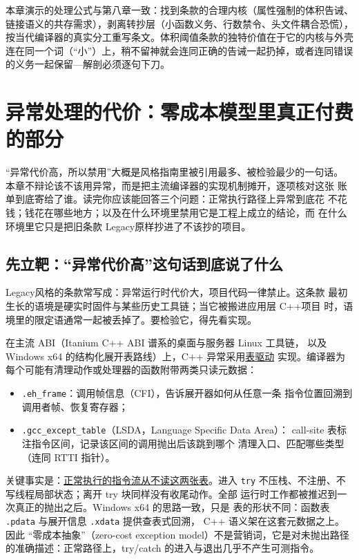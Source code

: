 \documentclass[12pt,a4paper,fontset=fandol]{ctexbook}
\newcommand{\Tp}[1]{\texttt{#1}}
\newcommand{\Lang}[1]{\textsf{#1}}
\newcommand{\CPP}{\Lang{C++}}
\newcommand{\DomTra}{\Lang{Legacy}}
\begin{document}
\begin{note}[title={与第八章的收束衔接}]
本章演示的处理公式与第八章一致：找到条款的合理内核（属性强制的体积告诫、链接语义的共存需求），剥离转抄层（小函数义务、行数禁令、头文件耦合恐慌），按当代编译器的真实分工重写条文。体积阈值条款的独特价值在于它的内核与外壳连在同一个词（``小''）上，稍不留神就会连同正确的告诫一起扔掉，或者连同错误的义务一起保留---解剖必须逐句下刀。
\end{note}


\chapter{异常处理的代价：零成本模型里真正付费的部分}
\label{ch:ch10-ehcost}

``异常代价高，所以禁用''大概是风格指南里被引用最多、被检验最少的一句话。
本章不辩论该不该用异常，而是把主流编译器的实现机制摊开，逐项核对这张
账单到底寄给了谁。读完你应该能回答三个问题：正常执行路径上异常到底花
不花钱；钱花在哪些地方；以及在什么环境里禁用它是工程上成立的结论，而
在什么环境里它只是把旧条款 \DomTra 原样抄进了不该抄的项目。

\section{先立靶：``异常代价高''这句话到底说了什么}
\label{sec:ch10-target}

\DomTra 风格的条款常写成：异常运行时代价大，项目代码一律禁止。这条款
最初生长的语境是硬实时固件与某些历史工具链；当它被搬进应用层 \CPP 项目
时，语境里的限定语通常一起被丢掉了。要检验它，得先看实现。

在主流 ABI（Itanium C++ ABI 谱系的桌面与服务器 \Lang{Linux} 工具链，
以及 Windows x64 的结构化展开表路线）上，C++ 异常采用\underline{表驱动}
实现。编译器为每个可能有清理动作或处理器的函数附带两类只读元数据：

\begin{itemize}
  \item \Tp{.eh\_frame}：调用帧信息（CFI），告诉展开器如何从任意一条
        指令位置回溯到调用者帧、恢复寄存器；
  \item \Tp{.gcc\_except\_table}（LSDA，Language Specific Data Area）：
        call-site 表标注指令区间，记录该区间的调用抛出后该跳到哪个
        清理入口、匹配哪些类型（连同 RTTI 指针）。
\end{itemize}

关键事实是：\underline{正常执行的指令流从不读这两张表}。进入 \Tp{try}
不压栈、不注册、不写线程局部状态；离开 try 块同样没有收尾动作。全部
运行时工作都被推迟到一次真正的抛出之后。Windows x64 的思路一致，只是
表的形状不同：函数表 \Tp{.pdata} 与展开信息 \Tp{.xdata} 提供查表式回溯，
C++ 语义架在这套元数据之上。因此 ``零成本抽象''（zero-cost exception
model）不是营销词，它是对未抛出路径的准确描述：正常路径上，try/catch
的进入与退出几乎不产生可测指令。
\end{document}
